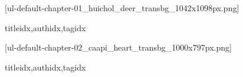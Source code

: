 


  \setcounter{chapter}{0}

  [ul-default-chapter-01_huichol_deer_transbg_1042x1098px.png]
    \begin{ulSongs}{titleidx,authidx,tagidx}
      
    \end{ulSongs}

  [ul-default-chapter-02_caapi_heart_transbg_1000x797px.png]
    \begin{ulSongs}{titleidx,authidx,tagidx}
      
    \end{ulSongs}
